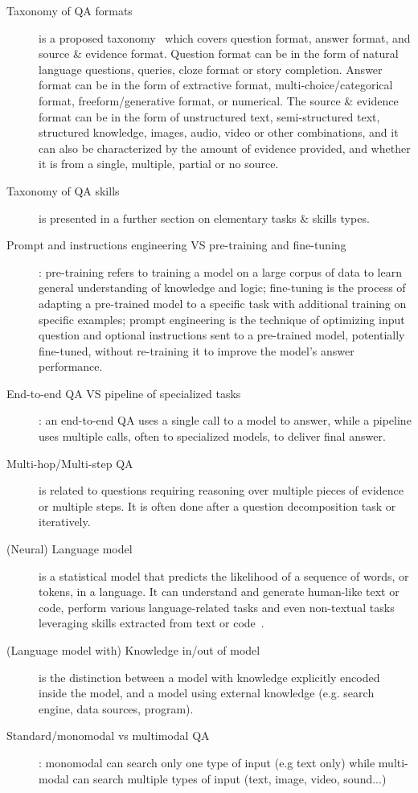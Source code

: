 \documentclass[acmsmall]{acmart}
\begin{document}
\begin{description}
\item [Taxonomy of QA formats] is a proposed taxonomy~\citep{rogersQADatasetExplosion2022} which covers question format, answer format, and source \& evidence format. Question format can be in the form of natural language questions, queries, cloze format or story completion. Answer format can be in the form of extractive format, multi-choice/categorical format, freeform/generative format, or numerical. The source \& evidence format can be in the form of unstructured text, semi-structured text, structured knowledge, images, audio, video or other combinations, and it can also be characterized by the amount of evidence provided, and whether it is from a single, multiple, partial or no source.
\item [Taxonomy of QA skills] is presented in a further section on elementary tasks \& skills types.
\item [Prompt and instructions engineering VS pre-training and fine-tuning]: pre-training refers to training a model on a large corpus of data to learn general understanding of knowledge and logic; fine-tuning is the process of adapting a pre-trained model to a specific task with additional training on specific examples; prompt engineering is the technique of optimizing input question and optional instructions sent to a pre-trained model, potentially fine-tuned, without re-training it to improve the model's answer performance.
\item [End-to-end QA VS pipeline of specialized tasks]: an end-to-end QA uses a single call to a model to answer, while a pipeline uses multiple calls, often to specialized models, to deliver final answer.
\item [Multi-hop/Multi-step QA] is related to questions requiring reasoning over multiple pieces of evidence or multiple steps. It is often done after a question decomposition task or iteratively.
\item [(Neural) Language model] is a statistical model that predicts the likelihood of a sequence of words, or tokens, in a language. It can understand and generate human-like text or code, perform various language-related tasks and even non-textual tasks leveraging skills extracted from text or code~\citep{haoLanguageModelsAre2022}.
\item [(Language model with) Knowledge in/out of model] is the distinction between a model with knowledge explicitly encoded inside the model, and a model using external knowledge (e.g. search engine, data sources, program).
\item [Standard/monomodal vs multimodal QA]: monomodal can search only one type of input (e.g text only) while multi-modal can search multiple types of input (text, image, video, sound...)

\end{description}
\end{document}
